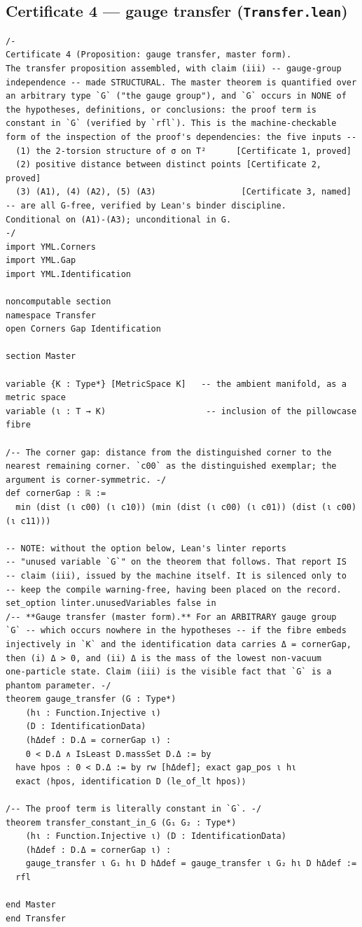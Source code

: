 \documentclass[11pt,a4paper]{article}
\theoremstyle{plain}
\theoremstyle{definition}
\theoremstyle{remark}
\begin{document}
\subsection*{Certificate 4 --- gauge transfer (\texttt{Transfer.lean})}
\begin{Verbatim}[fontsize=\footnotesize,breaklines=true,breakanywhere=true,formatcom=\leanmono]
/-
Certificate 4 (Proposition: gauge transfer, master form).
The transfer proposition assembled, with claim (iii) -- gauge-group
independence -- made STRUCTURAL. The master theorem is quantified over
an arbitrary type `G` ("the gauge group"), and `G` occurs in NONE of
the hypotheses, definitions, or conclusions: the proof term is
constant in `G` (verified by `rfl`). This is the machine-checkable
form of the inspection of the proof's dependencies: the five inputs --
  (1) the 2-torsion structure of σ on T²      [Certificate 1, proved]
  (2) positive distance between distinct points [Certificate 2, proved]
  (3) (A1), (4) (A2), (5) (A3)                 [Certificate 3, named]
-- are all G-free, verified by Lean's binder discipline.
Conditional on (A1)-(A3); unconditional in G.
-/
import YML.Corners
import YML.Gap
import YML.Identification

noncomputable section
namespace Transfer
open Corners Gap Identification

section Master

variable {K : Type*} [MetricSpace K]   -- the ambient manifold, as a metric space
variable (ι : T → K)                    -- inclusion of the pillowcase fibre

/-- The corner gap: distance from the distinguished corner to the
nearest remaining corner. `c00` as the distinguished exemplar; the
argument is corner-symmetric. -/
def cornerGap : ℝ :=
  min (dist (ι c00) (ι c10)) (min (dist (ι c00) (ι c01)) (dist (ι c00) (ι c11)))

-- NOTE: without the option below, Lean's linter reports
-- "unused variable `G`" on the theorem that follows. That report IS
-- claim (iii), issued by the machine itself. It is silenced only to
-- keep the compile warning-free, having been placed on the record.
set_option linter.unusedVariables false in
/-- **Gauge transfer (master form).** For an ARBITRARY gauge group
`G` -- which occurs nowhere in the hypotheses -- if the fibre embeds
injectively in `K` and the identification data carries Δ = cornerGap,
then (i) Δ > 0, and (ii) Δ is the mass of the lowest non-vacuum
one-particle state. Claim (iii) is the visible fact that `G` is a
phantom parameter. -/
theorem gauge_transfer (G : Type*)
    (hι : Function.Injective ι)
    (D : IdentificationData)
    (hΔdef : D.Δ = cornerGap ι) :
    0 < D.Δ ∧ IsLeast D.massSet D.Δ := by
  have hpos : 0 < D.Δ := by rw [hΔdef]; exact gap_pos ι hι
  exact ⟨hpos, identification D (le_of_lt hpos)⟩

/-- The proof term is literally constant in `G`. -/
theorem transfer_constant_in_G (G₁ G₂ : Type*)
    (hι : Function.Injective ι) (D : IdentificationData)
    (hΔdef : D.Δ = cornerGap ι) :
    gauge_transfer ι G₁ hι D hΔdef = gauge_transfer ι G₂ hι D hΔdef :=
  rfl

end Master
end Transfer
\end{Verbatim}
\end{document}
